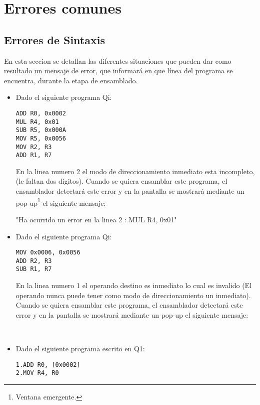 \section{Errores comunes}

\subsection{Errores de Sintaxis} 

En esta seccion se detallan las diferentes situaciones que pueden dar como resultado un mensaje de error, que informará en que línea del programa se encuentra, durante la etapa de ensamblado.

\begin{itemize}

\item Dado el siguiente programa Qi:

\begin{verbatim}
ADD R0, 0x0002
MUL R4, 0x01
SUB R5, 0x000A
MOV R5, 0x0056
MOV R2, R3
ADD R1, R7
\end{verbatim}

En la linea numero 2 el modo de direccionamiento inmediato esta incompleto, (le faltan dos dígitos). Cuando se quiera ensamblar este programa, el ensamblador detectará este error y en la pantalla se mostrará mediante un pop-up\footnote{Ventana emergente.} el siguiente mensaje:
 
"Ha ocurrido un error en la linea 2 : MUL R4, 0x01" \\  

\item Dado el siguiente programa Qi:

\begin{verbatim}
MOV 0x0006, 0x0056
ADD R2, R3
SUB R1, R7
\end{verbatim}

En la linea numero 1 el operando destino es inmediato lo cual es invalido (El operando nunca puede tener como modo de direccionamiento un inmediato). Cuando se quiera ensamblar este programa, el ensamblador detectará este error y en la pantalla se mostrará mediante un pop-up el siguiente mensaje:

 \\

\item Dado el siguiente programa escrito en Q1:

\begin{verbatim}
1.ADD R0, [0x0002]
2.MOV R4, R0
\end{verbatim}


\end{itemize}
